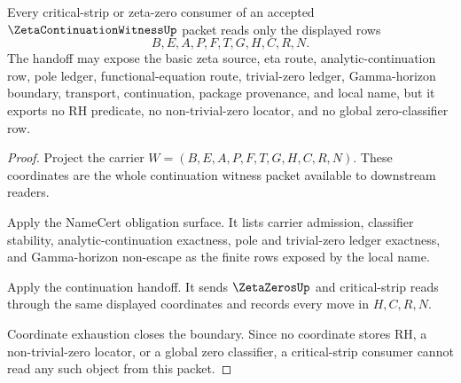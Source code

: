 \begin{theorem}
\label{thm:zeta-continuation-witness-critical-strip-handoff}
Every critical-strip or zeta-zero consumer of an accepted $\ZetaContinuationWitnessUp$ packet reads only the displayed rows
$$
B,E,A,P,F,T,G,H,C,R,N.
$$
The handoff may expose the basic zeta source, eta route, analytic-continuation row, pole ledger, functional-equation route, trivial-zero ledger, Gamma-horizon boundary, transport, continuation, package provenance, and local name, but it exports no RH predicate, no non-trivial-zero locator, and no global zero-classifier row.
\end{theorem}
\begin{proof}
Project the carrier $W=(B,E,A,P,F,T,G,H,C,R,N)$. These coordinates are the whole continuation witness packet available to downstream readers.

Apply the NameCert obligation surface. It lists carrier admission, classifier stability, analytic-continuation exactness, pole and trivial-zero ledger exactness, and Gamma-horizon non-escape as the finite rows exposed by the local name.

Apply the continuation handoff. It sends $\ZetaZerosUp$ and critical-strip reads through the same displayed coordinates and records every move in $H,C,R,N$.

Coordinate exhaustion closes the boundary. Since no coordinate stores RH, a non-trivial-zero locator, or a global zero classifier, a critical-strip consumer cannot read any such object from this packet.
\end{proof}

